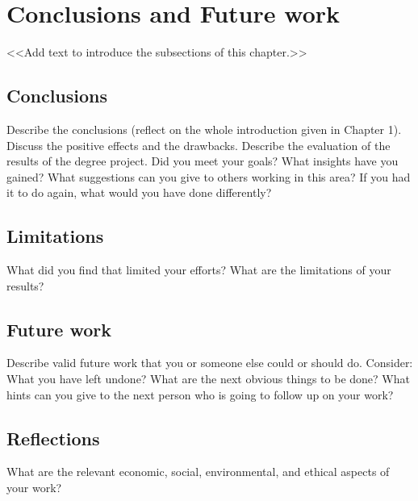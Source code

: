 \documentclass[a4paper,10pt,twocolumn]{article}
\numberwithin{figure}{section}
\numberwithin{table}{section}
\begin{document}
\section{Conclusions and Future work}
<<Add text to introduce the subsections of this chapter.>>

\subsection{Conclusions}
Describe the conclusions (reflect on the whole introduction given in Chapter 1).
Discuss the positive effects and the drawbacks.
Describe the evaluation of the results of the degree project.
Did you meet your goals?
What insights have you gained?
What suggestions can you give to others working in this area?
If you had it to do again, what would you have done differently?

\subsection{Limitations}
What did you find that limited your efforts? What are the limitations of your results?

\subsection{Future work}
Describe valid future work that you or someone else could or should do.
Consider: What you have left undone? What are the next obvious things to be done? What hints
can you give to the next person who is going to follow up on your work?

\subsection{Reflections}
What are the relevant economic, social, environmental, and ethical aspects of your work?







\nocite{*}


% 
\end{document}
